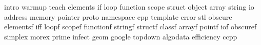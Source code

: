 intro
warmup
teach
elements
if
loop
function
scope
struct
object
array
string
io
address
memory
pointer
proto
namespace
cpp
template
error
stl
obscure
elementsf
iff
loopf
scopef
functionf
stringf
structf
classf
arrayf
pointf
iof
obscuref
simplex
morex
prime
infect
geom
google
topdown
algodata
efficiency
ccpp
